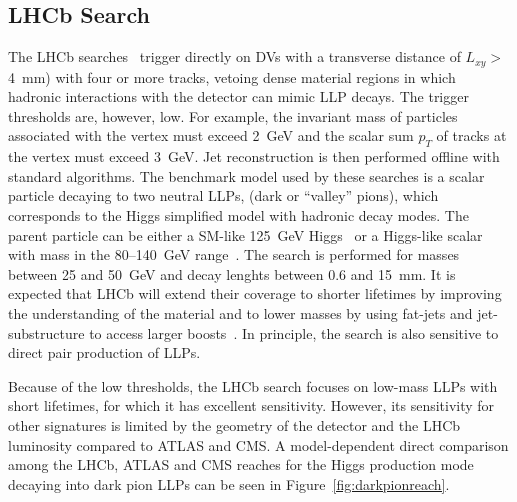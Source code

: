 \subsection{LHCb Search}

The LHCb searches~\cite{Aaij:2016isa,Aaij:2017mic} trigger directly on DVs with a transverse distance of $L_{xy} >$ 4~mm) with four or more tracks, vetoing dense material regions in which hadronic interactions with the detector can mimic LLP decays. The trigger thresholds are, however, low. For example, the invariant mass of particles associated with the vertex must exceed 2~GeV and the scalar sum $p_T$ of tracks at the vertex must exceed 3~GeV. Jet reconstruction is then performed offline with standard algorithms. The benchmark model used by these searches is a scalar particle decaying to two neutral LLPs, \piv (dark or ``valley'' pions), which corresponds to the Higgs simplified model with hadronic decay modes. The parent particle can be either a SM-like 125~GeV Higgs~\cite{Aaij:2017mic} or a Higgs-like scalar with mass in the 80--140~GeV range~\cite{Aaij:2016isa}. The search is performed for \piv masses between 25 and 50~GeV and decay lenghts between 0.6 and 15~mm. It is expected that LHCb will extend their coverage to shorter lifetimes by improving the understanding of the material and to lower masses by using fat-jets and jet-substructure to access larger boosts~\cite{Vaszquez:2017workshop}. In principle, the search is also sensitive to direct pair production of LLPs.

Because of the low thresholds, the LHCb search focuses on low-mass LLPs with short lifetimes, for which it has excellent sensitivity. However, its sensitivity for other signatures is limited by the geometry of the detector and the LHCb luminosity compared to ATLAS and CMS. A model-dependent direct comparison among the LHCb, ATLAS and CMS reaches for the Higgs production mode decaying into dark pion LLPs can be seen in Figure~\ref{fig:darkpionreach}.

